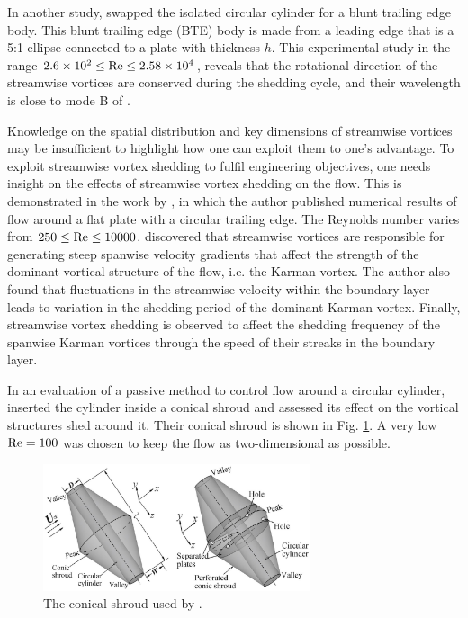 \documentclass[oneside]{utmthesis}
\begin{document}
 In another study, \citet{Gibeau2019} swapped the isolated circular cylinder for a blunt trailing edge body. This blunt trailing edge (BTE) body is made from a leading edge that is a 5:1 ellipse connected to a plate with thickness $h$. This experimental study in the range $2.6 \times 10^{2} \leq \text{Re} \leq 2.58 \times 10^{4}$, reveals that the rotational direction of the streamwise vortices are conserved during the shedding cycle, and their wavelength is close to mode B of \citet{Williamson1996a}.

Knowledge on the spatial distribution and key dimensions of streamwise vortices may be insufficient to highlight how one can exploit them to one's advantage. To exploit streamwise vortex shedding to fulfil engineering objectives, one needs insight on the effects of streamwise vortex shedding on the flow. This is demonstrated in the work by \citet{Rai2018}, in which the author published numerical results of flow around a flat plate with a circular trailing edge. The Reynolds number varies from $250 \leq \text{Re} \leq 10000$. \citet{Rai2018} discovered that streamwise vortices are responsible for generating steep spanwise velocity gradients that affect the strength of the dominant vortical structure of the flow, i.e. the Karman vortex. The author also found that fluctuations in the streamwise velocity within the boundary layer leads to variation in the shedding period of the dominant Karman vortex. Finally, streamwise vortex shedding is observed to affect the shedding frequency of the spanwise Karman vortices through the speed of their streaks in the boundary layer.

In an evaluation of a passive method to control flow around a circular cylinder, \citet{Lin2018} inserted the cylinder inside a conical shroud and assessed its effect on the vortical structures shed around it. Their conical shroud is shown in Fig. \ref{fig:conicalShroud}. A very low $\text{Re} = 100$ was chosen to keep the flow as two-dimensional as possible.

\begin{figure}[!h]
  \centering
  \hspace{1cm} \includegraphics[width=0.7\textwidth]{figs/conicalShroud}
    \caption{The conical shroud used by \citet{Lin2018}.}
    \label{fig:conicalShroud}
  \end{figure}
\end{document}
